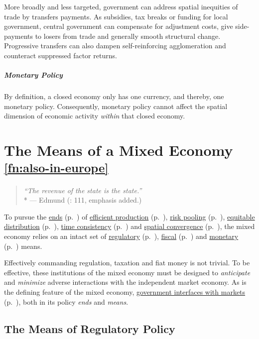 More broadly and less targeted, government can address spatial inequities of trade by transfers payments. As subsidies, tax breaks or funding for local government, central government can compensate for adjustment costs, give side-payments to losers from trade and generally smooth structural change. Progressive transfers can also dampen self-reinforcing agglomeration and counteract suppressed factor returns.

\subparagraph{Monetary Policy}
By definition, a closed economy only has one currency, and thereby, one monetary policy. Consequently, monetary policy cannot affect the spatial dimension of economic activity \emph{within} that closed economy. 

\section[Means]{The Means of a Mixed Economy \textsuperscript{\ref{fn:also-in-europe}}} \label{sec:means}

\begin{quote}
	\emph{``The revenue of the state \emph{is} the state.''}\\*
	--- Edmund \citeauthor{Burke1790} (\citeyear{Burke1790}: 111, emphasis added.)
\end{quote}

To pursue the \hyperref[sec:ends]{ends} (p.~\pageref{sec:ends}) of \hyperref[sec:production]{efficient production} (p.~\pageref{sec:production}), \hyperref[sec:risk]{risk pooling} (p.~\pageref{sec:risk}), \hyperref[sec:distribution]{equitable distribution} (p.~\pageref{sec:distribution}), \hyperref[sec:time]{time consistency} (p.~\pageref{sec:time}) and \hyperref[sec:space]{spatial convergence} (p.~\pageref{sec:space}), the mixed economy relies on an intact set of \hyperref[sec:regulatory]{regulatory} (p.~\pageref{sec:regulatory}), \hyperref[sec:fiscal]{fiscal} (p.~\pageref{sec:fiscal}) and \hyperref[sec:monetary]{monetary} (p.~\pageref{sec:monetary}) means. 

Effectively commanding regulation, taxation and fiat money is not trivial. To be effective, these institutions of the mixed economy must be designed to \emph{anticipate} and \emph{minimize} adverse interactions with the independent market economy. As is the defining feature of the mixed economy, \hyperref[sec:interface]{government interfaces with markets} (p.~\pageref{sec:interface}), both in its policy \emph{ends} and \emph{means}.

\subsection[Regulatory Policy]{The Means of Regulatory Policy} \label{sec:regulatory} 

